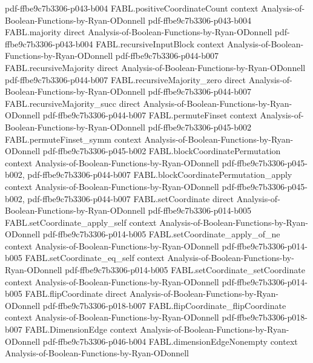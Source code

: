 \begin{theorem}
  {pdf-ffbe9c7b3306-p043-b004}
\proofstep
  {FABL.positiveCoordinateCount}
  {context}
  {Analysis-of-Boolean-Functions-by-Ryan-ODonnell}
  {pdf-ffbe9c7b3306-p043-b004}
\proofstep
  {FABL.majority}
  {direct}
  {Analysis-of-Boolean-Functions-by-Ryan-ODonnell}
  {pdf-ffbe9c7b3306-p043-b004}
\proofstep
  {FABL.recursiveInputBlock}
  {context}
  {Analysis-of-Boolean-Functions-by-Ryan-ODonnell}
  {pdf-ffbe9c7b3306-p044-b007}
\proofstep
  {FABL.recursiveMajority}
  {direct}
  {Analysis-of-Boolean-Functions-by-Ryan-ODonnell}
  {pdf-ffbe9c7b3306-p044-b007}
\proofstep
  {FABL.recursiveMajority_zero}
  {direct}
  {Analysis-of-Boolean-Functions-by-Ryan-ODonnell}
  {pdf-ffbe9c7b3306-p044-b007}
\proofstep
  {FABL.recursiveMajority_succ}
  {direct}
  {Analysis-of-Boolean-Functions-by-Ryan-ODonnell}
  {pdf-ffbe9c7b3306-p044-b007}
\proofstep
  {FABL.permuteFinset}
  {context}
  {Analysis-of-Boolean-Functions-by-Ryan-ODonnell}
  {pdf-ffbe9c7b3306-p045-b002}
\proofstep
  {FABL.permuteFinset_symm}
  {context}
  {Analysis-of-Boolean-Functions-by-Ryan-ODonnell}
  {pdf-ffbe9c7b3306-p045-b002}
\proofstep
  {FABL.blockCoordinatePermutation}
  {context}
  {Analysis-of-Boolean-Functions-by-Ryan-ODonnell}
  {pdf-ffbe9c7b3306-p045-b002,
    pdf-ffbe9c7b3306-p044-b007}
\proofstep
  {FABL.blockCoordinatePermutation_apply}
  {context}
  {Analysis-of-Boolean-Functions-by-Ryan-ODonnell}
  {pdf-ffbe9c7b3306-p045-b002,
    pdf-ffbe9c7b3306-p044-b007}
\proofstep
  {FABL.setCoordinate}
  {direct}
  {Analysis-of-Boolean-Functions-by-Ryan-ODonnell}
  {pdf-ffbe9c7b3306-p014-b005}
\proofstep
  {FABL.setCoordinate_apply_self}
  {context}
  {Analysis-of-Boolean-Functions-by-Ryan-ODonnell}
  {pdf-ffbe9c7b3306-p014-b005}
\proofstep
  {FABL.setCoordinate_apply_of_ne}
  {context}
  {Analysis-of-Boolean-Functions-by-Ryan-ODonnell}
  {pdf-ffbe9c7b3306-p014-b005}
\proofstep
  {FABL.setCoordinate_eq_self}
  {context}
  {Analysis-of-Boolean-Functions-by-Ryan-ODonnell}
  {pdf-ffbe9c7b3306-p014-b005}
\proofstep
  {FABL.setCoordinate_setCoordinate}
  {context}
  {Analysis-of-Boolean-Functions-by-Ryan-ODonnell}
  {pdf-ffbe9c7b3306-p014-b005}
\proofstep
  {FABL.flipCoordinate}
  {direct}
  {Analysis-of-Boolean-Functions-by-Ryan-ODonnell}
  {pdf-ffbe9c7b3306-p018-b007}
\proofstep
  {FABL.flipCoordinate_flipCoordinate}
  {context}
  {Analysis-of-Boolean-Functions-by-Ryan-ODonnell}
  {pdf-ffbe9c7b3306-p018-b007}
\proofstep
  {FABL.DimensionEdge}
  {context}
  {Analysis-of-Boolean-Functions-by-Ryan-ODonnell}
  {pdf-ffbe9c7b3306-p046-b004}
\proofstep
  {FABL.dimensionEdgeNonempty}
  {context}
  {Analysis-of-Boolean-Functions-by-Ryan-ODonnell}

\end{theorem}

